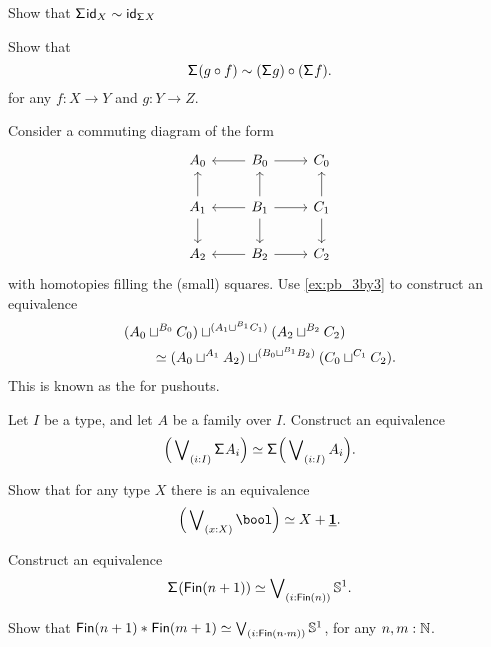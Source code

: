 \begin{exercises}
\begin{subexenum}
\item Show that $\susp \idfunc[X]\htpy\idfunc[\susp X]$
\item Show that
\begin{equation*}
\susp(g\circ f)\htpy (\susp g)\circ (\susp f).
\end{equation*}
for any $f:X\to Y$ and $g:Y\to Z$.
\end{subexenum}
\item Consider a commuting diagram of the form
\begin{equation*}
\begin{tikzcd}
A_0 & B_0 \arrow[l] \arrow[r] & C_0 \\
A_1 \arrow[u] \arrow[d] & B_1 \arrow[u] \arrow[r] \arrow[d] \arrow[l] & C_1 \arrow[u] \arrow[d] \\
A_2 & B_2 \arrow[l] \arrow[r] & C_2
\end{tikzcd}
\end{equation*}
with homotopies filling the (small) squares. Use \cref{ex:pb_3by3} to construct an equivalence
\begin{align*}
& (A_0\sqcup^{B_0} C_0) \sqcup^{(A_1\sqcup^{B_1} C_1)} (A_2 \sqcup^{B_2} C_2) \\
& \qquad \eqvsym (A_0 \sqcup^{A_1} A_2) \sqcup^{(B_0\sqcup^{B_1} B_2)} (C_0\sqcup^{C_1} C_2).
\end{align*}
This is known as the  for pushouts.
\item 
\begin{subexenum}
\item Let $I$ be a type, and let $A$ be a family over $I$. Construct an equivalence
\begin{equation*}
\eqv{\Big(\bigvee\nolimits_{(i:I)}\susp A_i\Big)}{\susp\Big(\bigvee\nolimits_{(i:I)}A_i\Big)}.
\end{equation*}
\item Show that for any type $X$ there is an equivalence
\begin{equation*}
\eqv{\Big(\bigvee\nolimits_{(x:X)}\bool\Big)}{X+\unit}.
\end{equation*}
\item Construct an equivalence
\begin{equation*}
\eqv{\susp(\mathsf{Fin}(n+1))}{\bigvee\nolimits_{(i:\mathsf{Fin}(n))}\sphere{1}}.
\end{equation*}
\end{subexenum}
\item Show that $\eqv{\join{\mathsf{Fin}(n+1)}{\mathsf{Fin}(m+1)}}{\bigvee\nolimits_{(i:\mathsf{Fin}(n\cdot m))}\sphere{1}}$, for any $n,m:\N$. 
\end{exercises}
